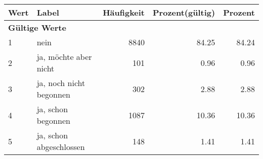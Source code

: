      \begin{longtable}{lXrrr}
     \toprule
     \textbf{Wert} & \textbf{Label} & \textbf{Häufigkeit} & \textbf{Prozent(gültig)} & \textbf{Prozent} \\
     \endhead
     \midrule
     \multicolumn{5}{l}{\textbf{Gültige Werte}}\\

     1 &
     \multicolumn{1}{X}{ nein   } &


       \num{8840} &
       \num[round-mode=places,round-precision=2]{84,25} &
         \num[round-mode=places,round-precision=2]{84,24} \\

     2 &
     \multicolumn{1}{X}{ ja, möchte aber nicht   } &


       \num{101} &
       \num[round-mode=places,round-precision=2]{0,96} &
         \num[round-mode=places,round-precision=2]{0,96} \\

     3 &
     \multicolumn{1}{X}{ ja, noch nicht begonnen   } &


       \num{302} &
       \num[round-mode=places,round-precision=2]{2,88} &
         \num[round-mode=places,round-precision=2]{2,88} \\

     4 &
     \multicolumn{1}{X}{ ja, schon begonnen   } &


       \num{1087} &
       \num[round-mode=places,round-precision=2]{10,36} &
         \num[round-mode=places,round-precision=2]{10,36} \\

     5 &
     \multicolumn{1}{X}{ ja, schon abgeschlossen   } &


       \num{148} &
       \num[round-mode=places,round-precision=2]{1,41} &
         \num[round-mode=places,round-precision=2]{1,41} \\


\end{longtable}

